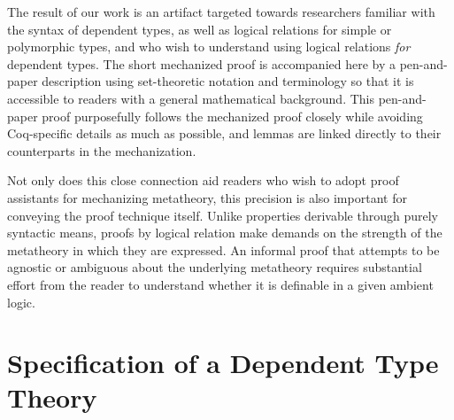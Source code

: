 \documentclass[\ifpublic nolinenum\else\fi,online,OA]{jfp}
\theoremstyle{definition}
\begin{document}
The result of our work is an artifact targeted towards researchers
familiar with the syntax of dependent types, as well as logical relations
for simple or polymorphic types, and who wish to understand using logical
relations \emph{for} dependent types.
The short mechanized proof is accompanied here by a pen-and-paper description
using set-theoretic notation and terminology so that it is accessible to
readers with a general mathematical background. This pen-and-paper proof
purposefully follows the mechanized proof closely while avoiding Coq-specific
details as much as possible, and lemmas are linked directly to their
counterparts in the mechanization.

Not only does this close connection aid readers who wish to adopt proof
assistants for mechanizing metatheory, this precision is also important for
conveying the proof technique itself. Unlike properties derivable through
purely syntactic means, proofs by logical relation make demands on the
strength of the metatheory in which they are expressed. An informal proof that
attempts to be agnostic or ambiguous about the underlying metatheory requires
substantial effort from the reader to understand whether it is definable in a
given ambient logic.


\section{Specification of a Dependent Type Theory}
\label{sec:spec}
\end{document}
